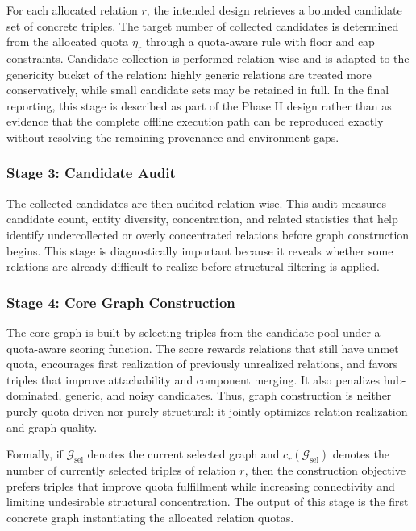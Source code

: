 \documentclass[12pt,a4paper]{article}
\begin{document}
For each allocated relation \(r\), the intended design retrieves a bounded candidate set of concrete triples. The target number of collected candidates is determined from the allocated quota \(\eta_r\) through a quota-aware rule with floor and cap constraints. Candidate collection is performed relation-wise and is adapted to the genericity bucket of the relation: highly generic relations are treated more conservatively, while small candidate sets may be retained in full. In the final reporting, this stage is described as part of the Phase II design rather than as evidence that the complete offline execution path can be reproduced exactly without resolving the remaining provenance and environment gaps.

\subsubsection{Stage 3: Candidate Audit}

The collected candidates are then audited relation-wise. This audit measures candidate count, entity diversity, concentration, and related statistics that help identify undercollected or overly concentrated relations before graph construction begins. This stage is diagnostically important because it reveals whether some relations are already difficult to realize before structural filtering is applied.

\subsubsection{Stage 4: Core Graph Construction}

The core graph is built by selecting triples from the candidate pool under a quota-aware scoring function. The score rewards relations that still have unmet quota, encourages first realization of previously unrealized relations, and favors triples that improve attachability and component merging. It also penalizes hub-dominated, generic, and noisy candidates. Thus, graph construction is neither purely quota-driven nor purely structural: it jointly optimizes relation realization and graph quality.

Formally, if \(\mathcal{G}_{\mathrm{sel}}\) denotes the current selected graph and \(c_r(\mathcal{G}_{\mathrm{sel}})\) denotes the number of currently selected triples of relation \(r\), then the construction objective prefers triples that improve quota fulfillment while increasing connectivity and limiting undesirable structural concentration. The output of this stage is the first concrete graph instantiating the allocated relation quotas.
\end{document}
